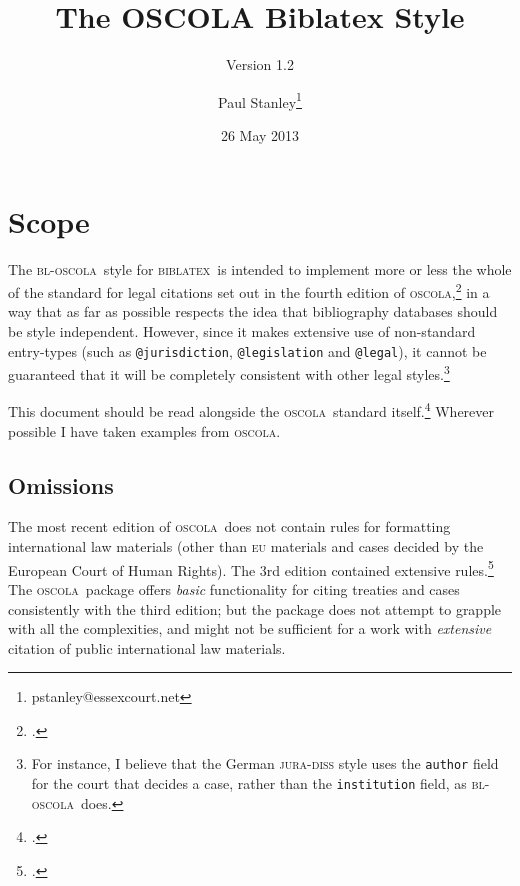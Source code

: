 \documentclass[a4paper,
               11pt,
	       DIV=1,			   
	       footinclude=false]
	      {scrartcl}
\def\releasedate{26 May 2013}
\def\versionnumber{1.2}
\newcommand{\oscola}{\textsc{bl-oscola}}
\newcommand{\biblatex}{\textsc{biblatex}}
\newcommand{\oscolashort}{\textsc{oscola}\nocite{oscola}}
\begin{document}
\title{The OSCOLA Biblatex Style}
\subtitle{Version \versionnumber}

\author{Paul Stanley\thanks{pstanley@essexcourt.net}}

\date{\releasedate}

\maketitle

\tableofcontents

\section{Scope}

The \oscola\ style for \biblatex\
is intended to implement more or less the whole of the standard for
legal citations set out in the fourth edition of
\oscolashort,\footcite{oscola} in a way that as far as possible
respects the idea that bibliography databases should be style
independent. However, since it
makes extensive use of non-standard entry-types (such as
\texttt{@jurisdiction}, \texttt{@legislation} and \texttt{@legal}), it
cannot be guaranteed that it will be completely consistent with other
legal styles.\footnote{For instance, I believe that the German
  \textsc{jura-diss} style uses the \texttt{author} field for the
  court that decides a case, rather than the \texttt{institution}
  field, as \oscola\ does.}

This document should be read alongside the \oscolashort\ standard
itself.\footcite{oscola} Wherever possible I have taken examples from
\oscolashort.

\subsection{Omissions\label{scope}}

 The most
recent edition of \oscolashort\ does not contain rules for formatting
international law materials (other than \textsc{eu} materials and
cases decided by the European Court of Human Rights). The 3rd edition
contained extensive rules.\footcite[25--37]{oscola3} The \oscolashort\
package offers \emph{basic} functionality for citing treaties and cases
consistently with the third edition; but the package does not attempt
to grapple with all the complexities, and might not be sufficient for
a work with \emph{extensive} citation of public international law
materials.
\end{document}
